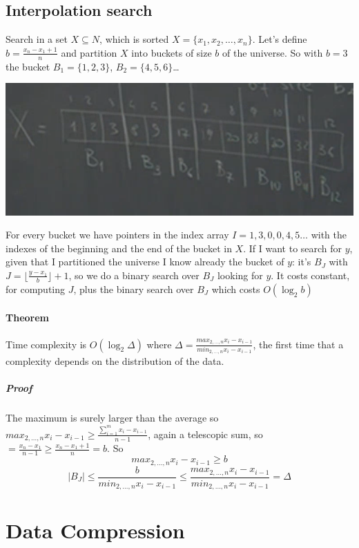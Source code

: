 \documentclass[10pt]{report}
\begin{document}
\subsection{Interpolation search} Search in a set $X \subseteq N$, which is sorted $X=\{x_1,x_2,\ldots,x_n\}$. Let's define $b = \frac{x_n - x_1 + 1}{n}$ and partition $X$ into buckets of size $b$ of the universe. So with $b= 3$ the bucket $B_1 = \{1,2,3\}$, $B_2 = \{4,5,6\}$\ldots
\begin{center}
	\includegraphics[scale=0.75]{10.png}
\end{center}
For every bucket we have pointers in the index array $I = 1,3,0,0,4,5\ldots$ with the indexes of the beginning and the end of the bucket in $X$. If I want to search for $y$, given that I partitioned the universe I know already the bucket of $y$: it's $B_J$ with $J = \lfloor\frac{y-x_1}{b}\rfloor + 1$, so we do a binary search over $B_J$ looking for $y$. It costs constant, for computing $J$, plus the binary search over $B_J$ which costs $O(\log_2 b)$
\paragraph{Theorem} Time complexity is $O(\log_2 \Delta)$ where $\Delta = \frac{max_{2,\ldots,n} x_i - x_{i-1}}{min_{2,\ldots,n} x_i - x_{i-1}}$, the first time that a complexity depends on the distribution of the data.
\subparagraph{Proof} The maximum is surely larger than the average so $max_{2,\ldots,n} x_i - x_{i-1} \geq \frac{\sum_{i=1}^m x_i - x_{i-1}}{n-1}$, again a telescopic sum, so $= \frac{x_n - x_1}{n-1} \geq \frac{x_n - x_1 + 1}{n} = b$. So $$max_{2,\ldots,n} x_i - x_{i-1} \geq b$$
$$|B_J| \leq \frac{b}{min_{2,\ldots,n} x_i - x_{i-1}} \leq \frac{max_{2,\ldots,n} x_i - x_{i-1}}{min_{2,\ldots,n} x_i - x_{i-1}} = \Delta$$
\section{Data Compression}
\end{document}
